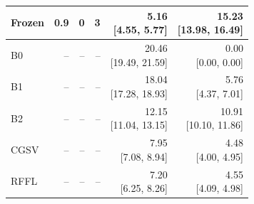 \begin{tabular}{lrrrrr}
Frozen & 0.9 & 0 & 3 & \shortstack{5.16\\{}[4.55, 5.77]} & \shortstack{15.23\\{}[13.98, 16.49]} \\
\midrule
B0 & -- & -- & -- & \shortstack{20.46\\{}[19.49, 21.59]} & \shortstack{0.00\\{}[0.00, 0.00]} \\
B1 & -- & -- & -- & \shortstack{18.04\\{}[17.28, 18.93]} & \shortstack{5.76\\{}[4.37, 7.01]} \\
B2 & -- & -- & -- & \shortstack{12.15\\{}[11.04, 13.15]} & \shortstack{10.91\\{}[10.10, 11.86]} \\
CGSV & -- & -- & -- & \shortstack{7.95\\{}[7.08, 8.94]} & \shortstack{4.48\\{}[4.00, 4.95]} \\
RFFL & -- & -- & -- & \shortstack{7.20\\{}[6.25, 8.26]} & \shortstack{4.55\\{}[4.09, 4.98]} \\
\bottomrule
\end{tabular}
